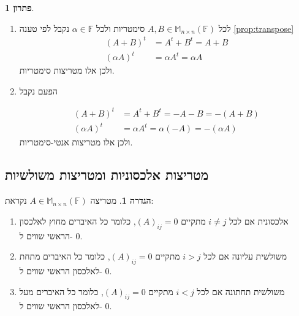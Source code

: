 \documentclass[12pt]{report}
\theoremstyle{plain}
\theoremstyle{definition}
\newtheorem{definition}[theorem]{הגדרה}
\newtheorem*{solution}{פתרון}
\newcommand{\F}{\mathbb{F}}
\newcommand{\M}{\mathbb{M}}
\newcommand{\0}{\mathbf{0}}
\begin{document}
\begin{solution}
\begin{enumerate}[label=\alph*.]
\item
לכל
$A,B\in\M_{n\times n}(\F)$
סימטריות ולכל
$\alpha\in\F$
נקבל לפי טענה
\ref{prop:transpose}
$$
\begin{aligned}
(A+B)^t&=A^t+B^t=A+B \\
(\alpha A)^t&=\alpha A^t=\alpha A
\end{aligned}
$$
ולכן אלו מטריצות סימטריות.

\item 
הפעם נקבל

$$
\begin{aligned}
(A+B)^t&=A^t+B^t=-A-B=-(A+B) \\
(\alpha A)^t&=\alpha A^t=\alpha(-A)=-(\alpha A)
\end{aligned}
$$
ולכן אלו מטריצות אנטי-סימטריות.


\end{enumerate}
\end{solution}

\subsection{מטריצות אלכסוניות ומטריצות משולשיות}

\begin{definition}
מטריצה 
$A\in\M_{n\times n}(\F)$
נקראת:

\begin{enumerate}[label=\alph*.]
\item 
אלכסונית אם לכל
$i\neq j$
מתקיים
$(A)_{ij}=0$,
כלומר כל האיברים מחוץ לאלכסון הראשי שווים ל-
$0$.


\item
משולשית עליונה אם לכל
$i>j$
מתקיים
$(A)_{ij}=0$,
כלומר כל האיברים מתחת לאלכסון הראשי שווים ל-
$0$.


\item
משולשית תחתונה אם לכל
$i<j$
מתקיים
$(A)_{ij}=0$,
כלומר כל האיברים מעל לאלכסון הראשי שווים ל-
$0$.


\end{enumerate}
\end{definition}
\end{document}
